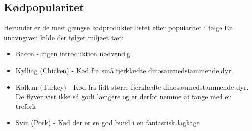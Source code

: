 \subsection{Kødpopularitet}

Herunder er de mest gængse kødprodukter listet efter popularitet i følge En unavngiven kilde der følger miljøet tæt:\\
\begin{itemize}
\item Bacon \cite{bib:url:WikiBacon} - ingen introduktion nødvendig
\item Kylling (Chicken) \cite{bib:url:WikiChicken} - Kød fra små fjerklædte dinosaurnedstammende dyr.
\item Kalkun (Turkey) \cite{bib:url:WikiTurkey}- Kød fra lidt større fjerklædte dinosaurnedstammende dyr. De flyver vist ikke så godt længere og er derfor nemme at fange med en trefork
\item Svin (Pork) \cite{bib:url:WikiPork} - Kød der er en god bund i en fantastisk lagkage
\end{itemize}


